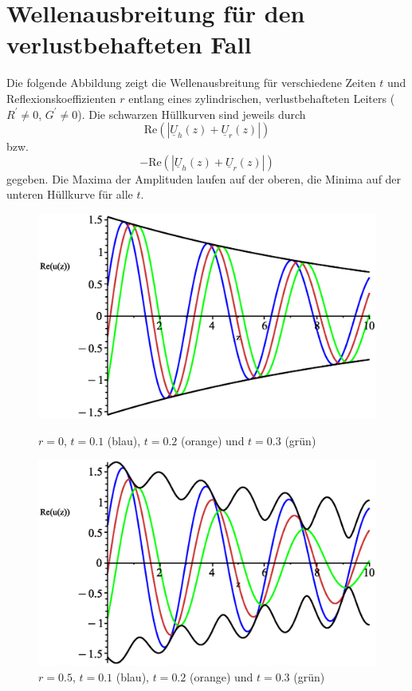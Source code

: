 \documentclass[paper=a4, parskip=half-, ngerman, fontsize=11pt]{scrreprt}
\begin{document}
\chapter{Wellenausbreitung für den verlustbehafteten Fall}
Die folgende Abbildung zeigt die Wellenausbreitung für verschiedene Zeiten $t$ und Reflexionskoeffizienten $r$ entlang
eines zylindrischen, verlustbehafteten Leiters (\mbox{$R^{\prime} \neq 0$}, $G^{\prime} \neq 0$). Die schwarzen
Hüllkurven sind jeweils durch
\[
\mathrm{Re} ( \left| \underline{U}_{h}(z) + \underline{U}_{r}(z) \right| )
\] bzw. \[
- \mathrm{Re} ( \left| \underline{U}_{h}(z) + \underline{U}_{r}(z) \right| )
\] gegeben. Die Maxima der Amplituden laufen auf der oberen, die Minima auf der unteren Hüllkurve für alle $t$.
\begin{figure}[H]
    \begin{minipage}{0.45\textwidth}
        \centering
        \includegraphics[width=\linewidth]{../graphics/Enveloppe/verlustbehaftet/R0}
        \caption*{$r=0$, $t=0.1$ (blau), $t=0.2$ (orange) und $t=0.3$ (grün)}
    \end{minipage}\hfill
    \begin{minipage}{0.45\textwidth}
        \centering
        \includegraphics[width=\linewidth]{../graphics/Enveloppe/verlustbehaftet/R0.5}
        \caption*{$r=0.5$, $t=0.1$ (blau), $t=0.2$ (orange) und $t=0.3$ (grün)}
    \end{minipage}


\end{figure}
\end{document}
